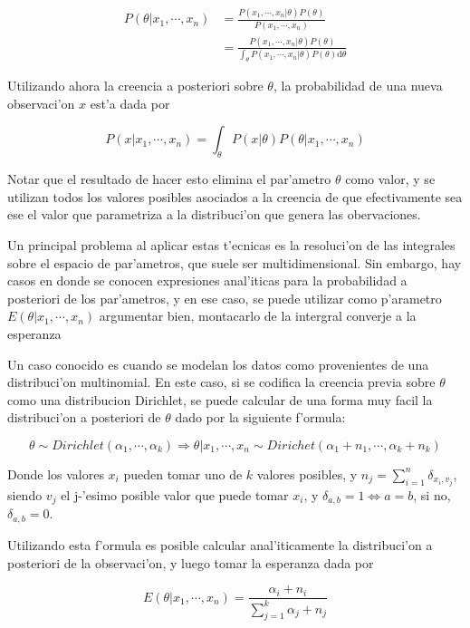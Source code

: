\begin{align*}
P(\theta|x_1,\cdots,x_n) &= \frac{P(x_1,\cdots,x_n|\theta) P(\theta)}{P(x_1,\cdots,x_n)} \\
                         &= \frac{P(x_1,\cdots,x_n|\theta) P(\theta)}{\int_\theta{P(x_1,\cdots,x_n|\theta)P(\theta)\mathrm{d}\theta}}
\end{align*}

Utilizando ahora la creencia a posteriori sobre $\theta$, la probabilidad de una nueva observaci'on $x$ est'a dada por

$$P(x|x_1,\cdots,x_n) = \int_\theta{P(x|\theta)P(\theta|x_1,\cdots,x_n)}$$

Notar que el resultado de hacer esto elimina el par'ametro $\theta$ como valor, y se utilizan todos los valores posibles asociados a la creencia de que efectivamente
sea ese el valor que parametriza a la distribuci'on que genera las obervaciones.


Un principal problema al aplicar estas t'ecnicas es la resoluci'on de las integrales sobre el espacio de par'ametros, que suele ser multidimensional. 
Sin embargo, hay casos en donde se conocen expresiones anal'iticas para la probabilidad a posteriori de los par'ametros, y en ese caso, se puede utilizar
como p'arametro $E(\theta|x_1,\cdots,x_n)$ \alert{argumentar bien, montacarlo de la intergral converje a la esperanza}%

Un caso conocido es cuando se modelan los datos como provenientes de una distribuci'on multinomial. En este caso, si se codifica la creencia previa
sobre $\theta$ como una distribucion Dirichlet, se puede calcular de una forma muy facil la distribuci'on a posteriori de $\theta$ dado por la siguiente
f'ormula:

$$ \theta \sim Dirichlet(\alpha_1,\cdots,\alpha_k) \Rightarrow \theta|x_1,\cdots,x_n \sim Dirichet(\alpha_1+n_1,\cdots,\alpha_k+n_k)$$

Donde los valores $x_i$ pueden tomar uno de $k$ valores posibles, y $n_j=\sum_{i=1}^n\delta_{x_i, v_j}$, siendo $v_j$ el j-'esimo posible valor que puede tomar $x_i$, y
$\delta_{a,b} = 1 \Leftrightarrow a = b$, si no, $\delta_{a, b} = 0$. 

Utilizando esta f'ormula es posible calcular anal'iticamente la distribuci'on a posteriori de la observaci'on, y luego tomar la esperanza dada por

$$E(\theta|x_1,\cdots,x_n)=\frac{\alpha_i + n_i}{\sum_{j=1}^{k}{\alpha_j+n_j}}$$

